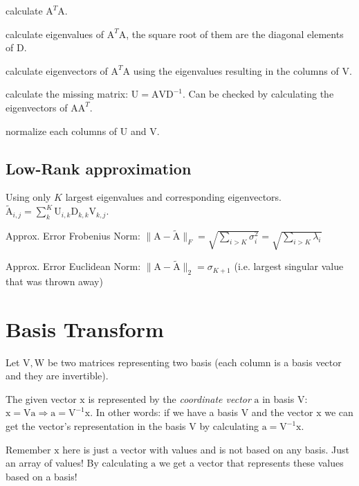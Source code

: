 \documentclass[a4paper, 11pt, landscape]{article}
\newcommand{\matr}[1]{\boldsymbol{\mathrm{#1}}}
\begin{document}
\begin{multicols*}{3}
\begin{compactenum}
	\item calculate $\matr{A}^T \matr{A}$.
	\item calculate eigenvalues of $\matr{A}^T \matr{A}$, the square root of them are the diagonal elements of $\matr{D}$.
	\item calculate eigenvectors of $\matr{A}^T \matr{A}$ using the eigenvalues resulting in the columns of $\matr{V}$.
	\item calculate the missing matrix: $\matr{U} = \matr{A} \matr{V} \matr{D}^{-1}$. Can be checked by calculating the eigenvectors of $\matr{A} \matr{A}^T$.
	\item normalize each columns of $\matr{U}$ and $\matr{V}$.
\end{compactenum}

\subsection{Low-Rank approximation}
Using only $K$ largest eigenvalues and corresponding eigenvectors. $\tilde{\matr{A}}_{i, j} = \sum_{k}^K \matr{U}_{i, k} \matr{D}_{k,k} \matr{V}_{k, j}$.
\begin{compactdesc}
	\item[Approx. Error Frobenius Norm:] $\|\matr{A} - \tilde{\matr{A}}\|_F = \sqrt{\sum_{i > K} \sigma_i^2} = \sqrt{\sum_{i > K} \lambda_i}$
	\item[Approx. Error Euclidean Norm:] $\|\matr{A} - \tilde{\matr{A}}\|_2 = \sigma_{K+1}$ (i.e. largest singular value that was thrown away)
\end{compactdesc}

\section{Basis Transform}
Let $\matr{V}, \matr{W}$ be two matrices representing two basis (each column is a basis vector and they are invertible).

The given vector $\matr{x}$ is represented by the \emph{coordinate vector} $\matr{a}$ in basis $\matr{V}$: $\matr{x} = \matr{V} \matr{a} \Rightarrow \matr{a} = \matr{V}^{-1} \matr{x}$. In other words: if we have a basis $\matr{V}$ and the vector $\matr{x}$ we can get the vector's representation in the basis $\matr{V}$ by calculating $\matr{a} = \matr{V}^{-1} \matr{x}$.

Remember $\matr{x}$ here is just a vector with values and is not based on any basis. Just an array of values! By calculating $\matr{a}$ we get a vector that represents these values based on a basis!


\end{multicols*}
\end{document}
